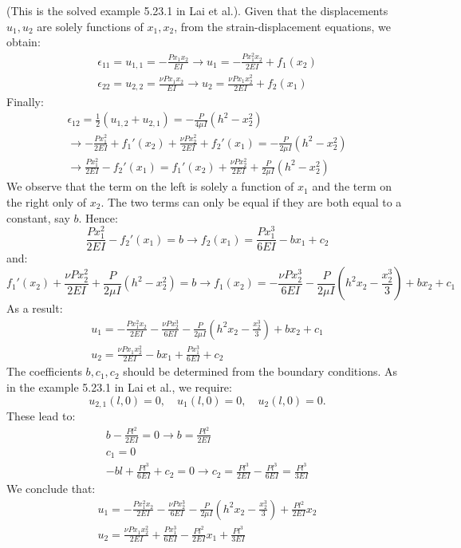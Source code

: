 \documentclass{article}
\newcommand{\ee}{\end{equation}}
\newcommand{\be}{\begin{equation}}
\begin{document}
\begin{enumerate}
(This is the solved example 5.23.1 in Lai et al.). Given that the displacements $u_1,u_2$ are solely functions of $x_1,x_2$, from the strain-displacement equations, we obtain:
\be
\begin{array}{l}
 \epsilon_{11}=u_{1,1}=-\frac{P x_1x_2}{E I} \to u_1=-\frac{P x_1^2x_2}{2E I}+f_1(x_2) \\
 \epsilon_{22}=u_{2,2}=\frac{\nu P x_1x_2}{E I} \to u_2=\frac{\nu P x_1x_2^2}{2E I}+f_2(x_1) 
\end{array}
\ee
Finally:
\be
\begin{array}{l}
\epsilon_{12}= \frac{1}{2}(u_{1,2}+u_{2,1})=-\frac{P }{4 \mu  I} (h^2-x_2^2)  \\
\to   -\frac{P x_1^2}{2E I}+f_1'(x_2)+\frac{\nu P x_2^2}{2E I}+f_2'(x_1) =-\frac{P }{2 \mu  I} (h^2-x_2^2) \\
\to \frac{P x_1^2}{2E I}-f_2'(x_1)=f_1'(x_2)+\frac{\nu P x_2^2}{2E I}+\frac{P }{2 \mu  I} (h^2-x_2^2)
\end{array}
\ee
We observe that the term on the left is solely a function of $x_1$ and the term on the right only of $x_2$. The two terms can only be equal if they are both equal to a constant, say $b$. Hence:
\be
 \frac{P x_1^2}{2E I}-f_2'(x_1)=b \to f_2(x_1)=\frac{P x_1^3}{6E I} - bx_1 + c_2
 \ee
 and:
 \be
 f_1'(x_2)+\frac{\nu P x_2^2}{2E I}+\frac{P }{2 \mu  I} (h^2-x_2^2)=b \to f_1(x_2)=-\frac{\nu P x_2^3}{6E I}-\frac{P }{2 \mu 
 I}(h^2x_2-\frac{x_2^3}{3})+bx_2+c_1
 \ee
 As a result:
 \be
 \begin{array}{l}
 u_1=-\frac{P x_1^2x_2}{2E I}-\frac{\nu P x_2^3}{6E I}-\frac{P }{2 \mu  I}(h^2x_2-\frac{x_2^3}{3})+bx_2+c_1 \\
 u_2=\frac{\nu P x_1x_2^2}{2E I}-bx_1+\frac{P x_1^3}{6E I}+c_2
  \end{array}
\ee
 The coefficients $b,c_1,c_2$ should be determined from the boundary conditions.
 As in the example 5.23.1 in Lai et al., we require:
\be
u_{2,1}(l,0)=0, \quad u_1(l,0)=0, \quad u_2(l,0)=0.
\ee
These lead to:
\be
\begin{array}{l}
 b- \frac{P l^2}{2E I}=0 \to b=\frac{P l^2}{2E I} \\
 c_1=0 \\
 -bl+\frac{P l^3}{6E I}+c_2=0 \to c_2= \frac{Pl^3}{2E I} - \frac{Pl^3}{6EI} = \frac{Pl^3}{3EI}
\end{array}
\ee
We conclude that:
\be
 \begin{array}{l}
 u_1=-\frac{P x_1^2x_2}{2E I}-\frac{\nu P x_2^3}{6E I}-\frac{P }{2 \mu  I}(h^2x_2-\frac{x_2^3}{3})+\frac{P l^2}{2E I}x_2 \\
 u_2=\frac{\nu P x_1x_2^2}{2E I}+\frac{P x_1^3}{6E I}-\frac{P l^2}{2E I}x_1+\frac{P l^3}{3E I}
  \end{array}
\ee




\end{enumerate}
\end{document}
